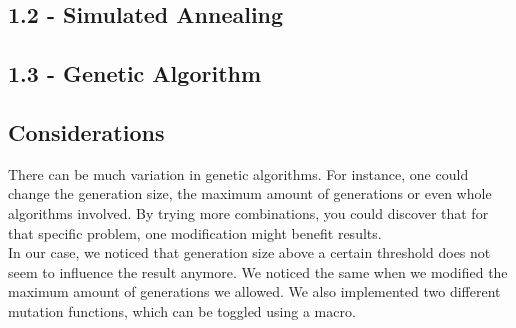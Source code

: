 \documentclass{article}
\begin{document}
\begin{enumerate}[1.]
\end{enumerate}

\subsection*{1.2 - Simulated Annealing}
\subsection*{1.3 - Genetic Algorithm}
\subsection*{Considerations}
There can be much variation in genetic algorithms. For instance, one could change the generation size, the maximum amount of generations or even whole algorithms involved. By trying more combinations, you could discover that for that specific problem, one modification might benefit results.\\
In our case, we noticed that generation size above a certain threshold does not seem to influence the result anymore. We noticed the same when we modified the maximum amount of generations we allowed. We also implemented two different mutation functions, which can be toggled using a macro.
\end{document}
